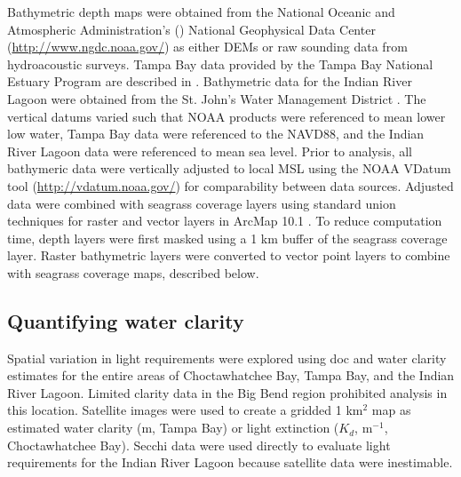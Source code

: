 \documentclass[letterpaper,12pt,oneside]{article}\usepackage[]{graphicx}\usepackage[]{color}
\begin{document}
Bathymetric depth maps were obtained from the National Oceanic and Atmospheric Administration's () National Geophysical Data Center (\url{http://www.ngdc.noaa.gov/}) as either \acp{DEM} or raw sounding data from hydroacoustic surveys.  Tampa Bay data provided by the Tampa Bay National Estuary Program are described in \citet{Tyler07}. Bathymetric data for the Indian River Lagoon were obtained from the St. John's Water Management District \citep{CPE97}.  The vertical datums varied such that \ac{NOAA} products were referenced to mean lower low water, Tampa Bay data were referenced to the \ac{NAVD88}, and the Indian River Lagoon data were referenced to mean sea level.  Prior to analysis, all bathymeric data were vertically adjusted to local \ac{MSL} using the \ac{NOAA} VDatum tool (\url{http://vdatum.noaa.gov/}) for comparability between data sources. Adjusted data were combined with seagrass coverage layers using standard union techniques for raster and vector layers in ArcMap 10.1 \citep{ESRI12}.  To reduce computation time, depth layers were first masked using a 1 km buffer of the seagrass coverage layer.  Raster bathymetric layers were converted to vector point layers to combine with seagrass coverage maps, described below.  

\subsection{Quantifying water clarity} \label{sec:clar_est}

Spatial variation in light requirements were explored using \ac{doc} and water clarity estimates for the entire areas of Choctawhatchee Bay, Tampa Bay, and the Indian River Lagoon. Limited clarity data in the Big Bend region prohibited analysis in this location.  Satellite images were used to create a gridded 1 km$^2$ map as estimated water clarity (m, Tampa Bay) or light extinction ($K_d$, m$^{-1}$, Choctawhatchee Bay).  Secchi data were used directly to evaluate light requirements for the Indian River Lagoon because satellite data were inestimable.
\end{document}
